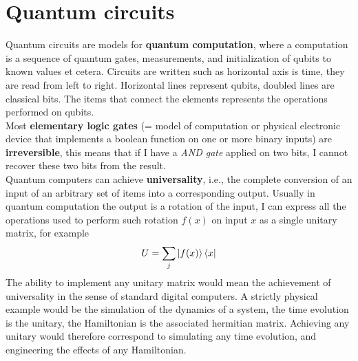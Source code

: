 \section{Quantum circuits}
Quantum circuits are models for \textbf{quantum computation},
where a computation is a sequence of quantum gates, measurements, and initialization of qubits to known values et cetera. Circuits are written such as horizontal axis is time, they are read from left to right. Horizontal lines represent qubits, doubled lines are classical bits. The items that connect the elements represents the operations performed on qubits.\\
Most\textbf{ elementary logic gates} (= model of computation or physical electronic device that implements a boolean function on one or more binary inputs) are \textbf{irreversible}, this means that if I have a \textit{AND gate} applied on two bits, I cannot recover these two bits from the result.\\
Quantum computers can achieve \textbf{universality}, i.e., the complete conversion of an input of an arbitrary set of items into a corresponding output. Usually in quantum computation the output is a rotation of the input, I can express all the operations used to perform such rotation $f(x)$ on input $x$ as a single unitary matrix, for example
\[
U=\sum_j\ket{f(x)}\bra{x}
\]
The ability to implement any unitary matrix would mean the achievement of universality in the sense of standard digital computers. A strictly physical example would be the simulation of the dynamics of a system, the time evolution is the unitary, the Hamiltonian is the associated hermitian matrix. Achieving any unitary would therefore correspond to simulating any time evolution, and engineering the effects of any Hamiltonian.\\

